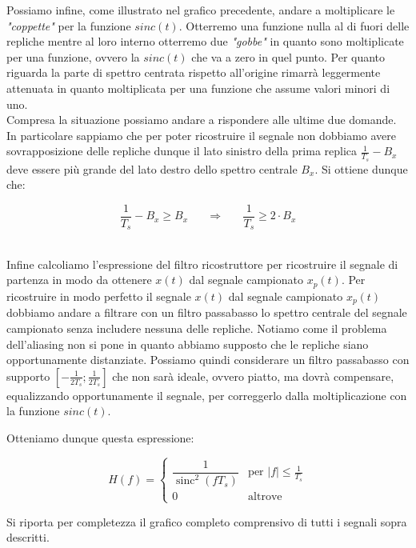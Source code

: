 \documentclass[../main.tex]{subfiles}
\begin{document}

  
Possiamo infine, come illustrato nel grafico precedente, andare a moltiplicare le \textit{"coppette"} per la funzione $sinc(t)$. Otterremo una funzione nulla al di fuori delle repliche mentre al loro interno otterremo due \textit{"gobbe"} in quanto sono moltiplicate per una funzione, ovvero la $sinc(t)$ che va a zero in quel punto. Per quanto riguarda la parte di spettro centrata rispetto all'origine rimarrà leggermente attenuata in quanto moltiplicata per una funzione che assume valori minori di uno.\\

Compresa la situazione possiamo andare a rispondere alle ultime due domande. In particolare sappiamo che per poter ricostruire il segnale non dobbiamo avere sovrapposizione delle repliche dunque il lato sinistro della prima replica $\tfrac{1}{T_s} - B_x$ deve essere più grande del lato destro dello spettro centrale $B_x$. Si ottiene dunque che:

\[ \frac{1}{T_s} - B_x \geq B_x  \hspace{20pt} \Longrightarrow  \hspace{20pt} \frac{1}{T_s} \geq 2 \cdot B_x   \]\

Infine calcoliamo l'espressione del filtro ricostruttore per ricostruire il segnale di partenza in modo da ottenere $x(t)$ dal segnale campionato $x_p(t)$.
Per ricostruire in modo perfetto il segnale $x(t)$ dal segnale campionato $x_p(t)$ dobbiamo andare a filtrare con un filtro passabasso lo spettro centrale del segnale campionato senza includere nessuna delle repliche. Notiamo come il problema dell'aliasing non si pone in quanto abbiamo supposto che le repliche siano opportunamente distanziate.
Possiamo quindi considerare un filtro passabasso con supporto $[-\tfrac{1}{2T_s};\tfrac{1}{2T_s}]$ che non sarà ideale, ovvero piatto, ma dovrà compensare, equalizzando opportunamente il segnale, per correggerlo dalla moltiplicazione con la funzione $sinc(t)$.

Otteniamo dunque questa espressione:

\[ 
H(f) = \begin{cases}
    \dfrac{1}{\operatorname{sinc}^2(f T_s)} & \text{per } |f| \leq \frac{1}{T_s} \\
    0                                       & \text{altrove}
\end{cases} 
\]

Si riporta per completezza il grafico completo comprensivo di tutti i segnali sopra descritti.
\end{document}
